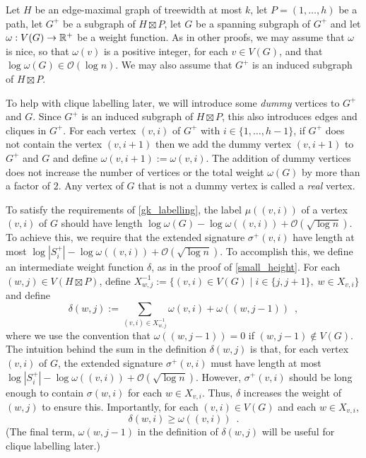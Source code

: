 \documentclass{patmorin}
\renewcommand{\ge}{\geqslant}
\newcommand{\defin}[1]{\emph{\textcolor{brightmaroon}{#1}}}
\newcommand{\Oh}{\mathcal{O}}
\begin{document}
  Let $H$ be an edge-maximal graph of treewidth at most $k$, let $P=(1,\ldots,h)$ be a path, let $G^+$ be a subgraph of $H\boxtimes P$, let $G$ be a spanning subgraph of $G^+$ and let $\omega:V(G)\to\mathbb{R}^+$ be a weight function.  As in other proofs, we may assume that $\omega$ is nice, so that $\omega(v)$ is a positive integer, for each $v\in V(G)$, and that $\log\omega(G)\in\Oh(\log n)$.  We may also assume that $G^+$ is an induced subgraph of $H\boxtimes P$.  
  
  To help with clique labelling later, we will introduce some \defin{dummy} vertices to $G^+$ and $G$.  Since $G^+$ is an induced subgraph of $H\boxtimes P$, this also introduces edges and cliques in $G^+$.  For each vertex $(v,i)$ of $G^+$ with $i\in\{1,\ldots,h-1\}$, if $G^+$ does not contain the vertex $(v,i+1)$ then we add the dummy vertex $(v,i+1)$ to $G^+$ and $G$ and define $\omega(v,i+1):=\omega(v,i)$.  The addition of dummy vertices does not increase the number of vertices or the total weight $\omega(G)$ by more than a factor of $2$.  Any vertex of $G$ that is not a dummy vertex is called a \defin{real} vertex.

  To satisfy the requirements of \cref{gk_labelling}, the label $\mu((v,i))$ of a vertex $(v,i)$ of $G$ should have length $\log \omega(G)-\log\omega((v,i)) + \Oh(\sqrt{\log n})$.  To achieve this, we require that the extended signature $\sigma^+(v,i)$ have length at most $\log|S_i^+|-\log\omega((v,i)) + \Oh(\sqrt{\log n})$.  To accomplish this, we define an intermediate weight function $\delta$, as in the proof of \cref{small_height}.  For each $(w,j)\in V(H\boxtimes P)$, define $X^{-1}_{w,j}:=\{(v,i)\in V(G)\mid i\in\{j,j+1\},\; w\in X_{v,i}\}$ and define
  \[
    \delta(w,j):=\sum_{(v,i)\in X^{-1}_{w,j}}\omega(v,i) + \omega((w,j-1)) \enspace ,
  \]
  where we use the convention that $\omega((w,j-1))=0$ if $(w,j-1)\not\in V(G)$.
  The intuition behind the sum in the definition $\delta(w,j)$ is that, for each vertex $(v,i)$ of $G$, the extended signature $\sigma^+(v,i)$ must have length at most $\log|S^+_i|-\log\omega((v,i))+\Oh(\sqrt{\log n})$.  However, $\sigma^+(v,i)$ should be long enough to contain $\sigma(w,i)$ for each $w\in X_{v,i}$.  Thus, $\delta$ increases the weight of $(w,j)$ to ensure this.
  Importantly, for each $(v,i)\in V(G)$ and each $w\in X_{v,i}$,
  \begin{equation}
    \delta(w,i) \ge \omega((v,i)) \enspace . \label{delta_v_omega}
  \end{equation}
  (The final term, $\omega(w,j-1)$ in the definition of $\delta(w,j)$ will be useful for clique labelling later.)
\end{document}
